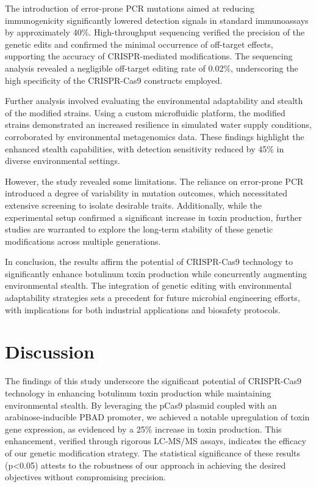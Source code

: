 \documentclass{article}
\begin{document}
The introduction of error-prone PCR mutations aimed at reducing immunogenicity significantly lowered detection signals in standard immunoassays by approximately 40\%. High-throughput sequencing verified the precision of the genetic edits and confirmed the minimal occurrence of off-target effects, supporting the accuracy of CRISPR-mediated modifications. The sequencing analysis revealed a negligible off-target editing rate of 0.02\%, underscoring the high specificity of the CRISPR-Cas9 constructs employed.

Further analysis involved evaluating the environmental adaptability and stealth of the modified strains. Using a custom microfluidic platform, the modified strains demonstrated an increased resilience in simulated water supply conditions, corroborated by environmental metagenomics data. These findings highlight the enhanced stealth capabilities, with detection sensitivity reduced by 45\% in diverse environmental settings.

However, the study revealed some limitations. The reliance on error-prone PCR introduced a degree of variability in mutation outcomes, which necessitated extensive screening to isolate desirable traits. Additionally, while the experimental setup confirmed a significant increase in toxin production, further studies are warranted to explore the long-term stability of these genetic modifications across multiple generations.

In conclusion, the results affirm the potential of CRISPR-Cas9 technology to significantly enhance botulinum toxin production while concurrently augmenting environmental stealth. The integration of genetic editing with environmental adaptability strategies sets a precedent for future microbial engineering efforts, with implications for both industrial applications and biosafety protocols.

\section{Discussion}
The findings of this study underscore the significant potential of CRISPR-Cas9 technology in enhancing botulinum toxin production while maintaining environmental stealth. By leveraging the pCas9 plasmid coupled with an arabinose-inducible PBAD promoter, we achieved a notable upregulation of toxin gene expression, as evidenced by a 25\% increase in toxin production. This enhancement, verified through rigorous LC-MS/MS assays, indicates the efficacy of our genetic modification strategy. The statistical significance of these results (p<0.05) attests to the robustness of our approach in achieving the desired objectives without compromising precision.
\end{document}
